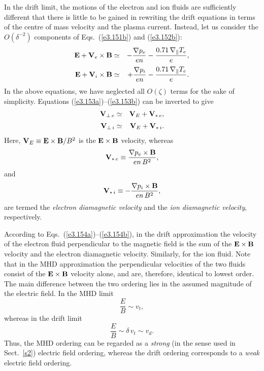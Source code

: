 In the drift limit, the motions of the electron and ion fluids are
sufficiently different that there is little to be gained in rewriting the
drift equations in terms of the centre of mass velocity and the plasma
current. 
Instead, let us consider the $O(\delta^{-2})$ components of Eqs.~(\ref{e3.151b}) and (\ref{e3.152b}):
\begin{eqnarray}\label{e3.153a}
{\bf E} + {\bf V}_e\times{\bf B} &\simeq& - \frac{\nabla p_e}{en}
 -\frac{ 0.71\,\nabla_\parallel T_e}{e},\\[0.5ex]
{\bf E} + {\bf V}_i\times {\bf B} &\simeq& +\frac{\nabla p_i}{en} -
\frac{ 0.71\,\nabla_\parallel T_e}{e}.\label{e3.153b}
\end{eqnarray}
In the above equations, we
 have neglected all $O(\zeta)$ terms  for the
sake of simplicity.
Equations (\ref{e3.153a})--(\ref{e3.153b})  can be inverted to give
\begin{eqnarray}\label{e3.154a}
{\bf V}_{\perp\,e}& \simeq & {\bf V}_E + {\bf V}_{\ast\,e},
\\[0.5ex]
{\bf V}_{\perp\,i} &\simeq & {\bf V}_E + {\bf V}_{\ast\,i}.\label{e3.154b}
\end{eqnarray}
Here, ${\bf V}_E\equiv {\bf E}\times{\bf B}/B^2$ is the ${\bf E}\times{\bf B}$
velocity, whereas
\begin{equation}
{\bf V}_{\ast\,e} \equiv \frac{\nabla p_e \times{\bf B}}
{en\,B^2},
\end{equation}
and
\begin{equation}
{\bf V}_{\ast\,i} \equiv -\frac{\nabla p_i 
\times{\bf B}}
{en\,B^2},
\end{equation}
are termed the {\em electron diamagnetic velocity}\/ and the {\em ion diamagnetic
velocity}, respectively. 


According to Eqs.~(\ref{e3.154a})--(\ref{e3.154b}), in the drift approximation the velocity  of the electron 
fluid perpendicular to the magnetic field is the sum of the ${\bf E}\times{\bf B}$
velocity and the electron diamagnetic velocity. Similarly, for the ion fluid. 
Note that in the MHD approximation  the perpendicular velocities of the
two fluids consist of  the ${\bf E}\times{\bf B}$ velocity alone, and are,
therefore, identical to lowest order. The main difference between the
two ordering lies in the assumed magnitude of the electric field. In the
MHD limit
\begin{equation}
\frac{E}{B} \sim v_t,
\end{equation}
whereas in the drift limit
\begin{equation}
\frac{E}{B} \sim \delta\,v_t\sim v_d.
\end{equation}
Thus, the MHD ordering can be regarded as a {\em strong}\/ (in the sense
used in  Sect.~\ref{s2}) electric field
ordering, whereas the drift ordering corresponds to a {\em weak}\/ electric
field ordering. 

